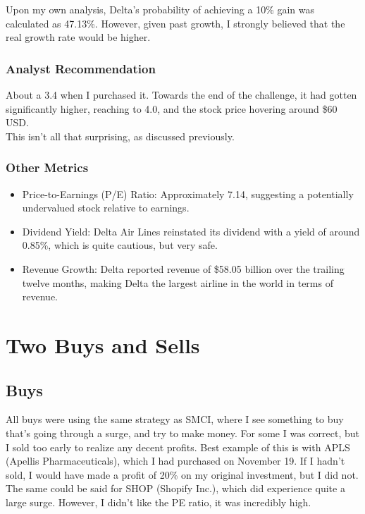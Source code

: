 \documentclass[a4paper, 12pt]{article}
\begin{document}
Upon my own analysis, Delta's probability of achieving a 10\% gain 
was calculated as 47.13\%. However, given past growth, I strongly 
believed that the real growth rate would be higher. 

\subsubsection*{Analyst Recommendation}

About a 3.4 when I purchased it. Towards the end of the challenge, 
it had gotten significantly higher, reaching to 4.0, and the stock 
price hovering around \$60 USD. \\

This isn't all that surprising, as discussed previously.
\subsubsection*{Other Metrics}
\begin{itemize}
    \item Price-to-Earnings (P/E) Ratio: Approximately 7.14, suggesting a 
    potentially undervalued stock relative to earnings.
    \item Dividend Yield: Delta Air Lines reinstated its dividend with a yield of around 0.85\%,
    which is quite cautious, but very safe.
    \item Revenue Growth: Delta reported revenue of \$58.05 billion over the 
    trailing twelve months, making Delta the largest airline in the world in terms of revenue.
\end{itemize}

\section{Two Buys and Sells}

\subsection*{Buys}
All buys were using the same strategy as SMCI, 
where I see something to buy that's going through a surge,
and try to make money. For some I was correct, but I sold too
early to realize any decent profits. Best example of this is
with APLS (Apellis Pharmaceuticals), which I had purchased on 
November 19. If I hadn't sold, I would have made a profit of 20\%
on my original investment, but I did not. \\

The same could be said for SHOP (Shopify Inc.), which did experience quite
a large surge. However, I didn't like the PE ratio, it was incredibly high.
\end{document}
